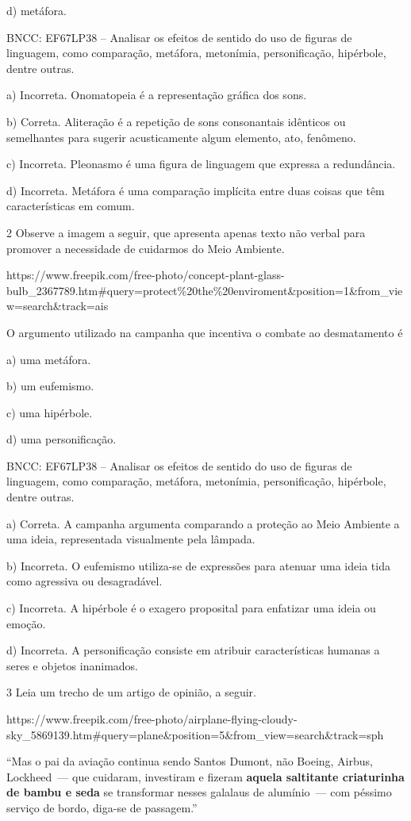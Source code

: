 d) metáfora.

BNCC: EF67LP38 -- Analisar os efeitos de sentido do uso de figuras de
linguagem, como comparação, metáfora, metonímia, personificação,
hipérbole, dentre outras.

a) Incorreta. Onomatopeia é a representação gráfica dos sons.

b) Correta. Aliteração é a repetição de sons consonantais idênticos ou
semelhantes para sugerir acusticamente algum elemento, ato, fenômeno.

c) Incorreta. Pleonasmo é uma figura de linguagem que expressa a
redundância.

d) Incorreta. Metáfora é uma comparação implícita entre duas coisas que
têm características em comum.

\num{2} Observe a imagem a seguir, que apresenta apenas texto não verbal
para promover a necessidade de cuidarmos do Meio Ambiente.

https://www.freepik.com/free-photo/concept-plant-glass-bulb\_2367789.htm\#query=protect\%20the\%20enviroment\&position=1\&from\_view=search\&track=ais

O argumento utilizado na campanha que incentiva o combate ao
desmatamento é

a) uma metáfora.

b) um eufemismo.

c) uma hipérbole.

d) uma personificação.

BNCC: EF67LP38 -- Analisar os efeitos de sentido do uso de figuras de
linguagem, como comparação, metáfora, metonímia, personificação,
hipérbole, dentre outras.

a) Correta. A campanha argumenta comparando a proteção ao Meio Ambiente
a uma ideia, representada visualmente pela lâmpada.

b) Incorreta. O eufemismo utiliza-se de expressões para atenuar uma
ideia tida como agressiva ou desagradável.

c) Incorreta. A hipérbole é o exagero proposital para enfatizar uma
ideia ou emoção.

d) Incorreta. A personificação consiste em atribuir características
humanas a seres e objetos inanimados.

\num{3} Leia um trecho de um artigo de opinião, a seguir.

https://www.freepik.com/free-photo/airplane-flying-cloudy-sky\_5869139.htm\#query=plane\&position=5\&from\_view=search\&track=sph

``Mas o pai da aviação continua sendo Santos Dumont, não Boeing, Airbus,
Lockheed~--- que cuidaram, investiram e fizeram \textbf{aquela
saltitante criaturinha de bambu e seda} se transformar nesses galalaus
de alumínio~--- com péssimo serviço de bordo, diga-se de passagem.''

